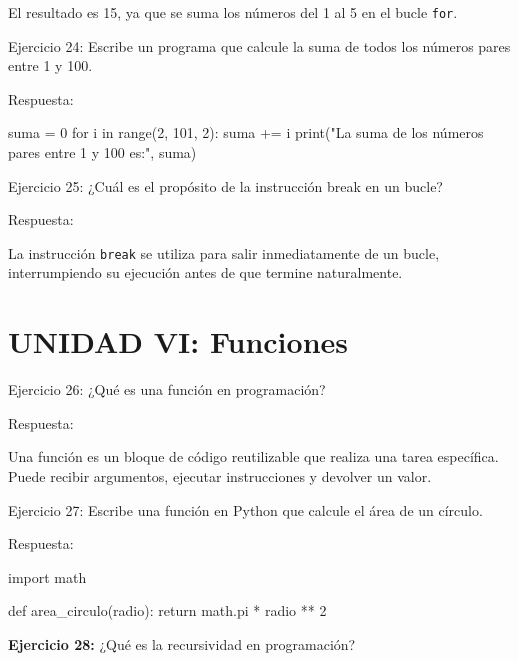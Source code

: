 \documentclass[
  a4paper,
  DIV=11,
  numbers=noendperiod,
  onepage,
  openany]{scrreprt}
\newenvironment{Shaded}{\begin{snugshade}}{\end{snugshade}}
\newcommand{\BuiltInTok}[1]{\textcolor[rgb]{0.00,0.23,0.31}{#1}}
\newcommand{\ControlFlowTok}[1]{\textcolor[rgb]{0.00,0.23,0.31}{#1}}
\newcommand{\DecValTok}[1]{\textcolor[rgb]{0.68,0.00,0.00}{#1}}
\newcommand{\ImportTok}[1]{\textcolor[rgb]{0.00,0.46,0.62}{#1}}
\newcommand{\KeywordTok}[1]{\textcolor[rgb]{0.00,0.23,0.31}{#1}}
\newcommand{\NormalTok}[1]{\textcolor[rgb]{0.00,0.23,0.31}{#1}}
\newcommand{\OperatorTok}[1]{\textcolor[rgb]{0.37,0.37,0.37}{#1}}
\newcommand{\StringTok}[1]{\textcolor[rgb]{0.13,0.47,0.30}{#1}}
\begin{document}
El resultado es 15, ya que se suma los números del 1 al 5 en el bucle
\texttt{for}.

Ejercicio 24: Escribe un programa que calcule la suma de todos los
números pares entre 1 y 100.

Respuesta:

\begin{Shaded}
\begin{Highlighting}[]
\NormalTok{suma }\OperatorTok{=} \DecValTok{0}
\ControlFlowTok{for}\NormalTok{ i }\KeywordTok{in} \BuiltInTok{range}\NormalTok{(}\DecValTok{2}\NormalTok{, }\DecValTok{101}\NormalTok{, }\DecValTok{2}\NormalTok{):}
\NormalTok{    suma }\OperatorTok{+=}\NormalTok{ i}
\BuiltInTok{print}\NormalTok{(}\StringTok{"La suma de los números pares entre 1 y 100 es:"}\NormalTok{, suma)}
\end{Highlighting}
\end{Shaded}

Ejercicio 25: ¿Cuál es el propósito de la instrucción break en un bucle?

Respuesta:

La instrucción \texttt{break} se utiliza para salir inmediatamente de un
bucle, interrumpiendo su ejecución antes de que termine naturalmente.

\section{UNIDAD VI: Funciones}\label{unidad-vi-funciones}

Ejercicio 26: ¿Qué es una función en programación?

Respuesta:

Una función es un bloque de código reutilizable que realiza una tarea
específica. Puede recibir argumentos, ejecutar instrucciones y devolver
un valor.

Ejercicio 27: Escribe una función en Python que calcule el área de un
círculo.

Respuesta:

\begin{Shaded}
\begin{Highlighting}[]
\ImportTok{import}\NormalTok{ math}

\KeywordTok{def}\NormalTok{ area\_circulo(radio):}
\ControlFlowTok{return}\NormalTok{ math.pi }\OperatorTok{*}\NormalTok{ radio }\OperatorTok{**} \DecValTok{2}
\end{Highlighting}
\end{Shaded}

\textbf{Ejercicio 28:} ¿Qué es la recursividad en programación?
\end{document}
